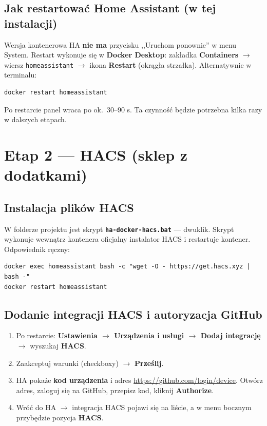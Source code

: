 \documentclass[11pt,a4paper]{article}
\begin{document}
\subsection{Jak restartować Home Assistant (w tej instalacji)}
\label{sec:restart}

Wersja kontenerowa HA \textbf{nie ma} przycisku ,,Uruchom ponownie'' w menu System. Restart wykonuje się w \textbf{Docker Desktop}: zakładka \textbf{Containers} $\to$ wiersz \texttt{homeassistant} $\to$ ikona \textbf{Restart} (okrągła strzałka). Alternatywnie w terminalu:

\begin{lstlisting}
docker restart homeassistant
\end{lstlisting}

Po restarcie panel wraca po ok.~30--90 s. Ta czynność będzie potrzebna kilka razy w dalszych etapach.

\section{Etap 2 --- HACS (sklep z dodatkami)}
\label{sec:etap2}

\subsection{Instalacja plików HACS}

W folderze projektu jest skrypt \textbf{\texttt{ha-docker-hacs.bat}} --- dwuklik. Skrypt wykonuje wewnątrz kontenera oficjalny instalator HACS i restartuje kontener. Odpowiednik ręczny:

\begin{lstlisting}
docker exec homeassistant bash -c "wget -O - https://get.hacs.xyz | bash -"
docker restart homeassistant
\end{lstlisting}

\subsection{Dodanie integracji HACS i autoryzacja GitHub}

\begin{enumerate}
\item Po restarcie: \textbf{Ustawienia $\to$ Urządzenia i usługi $\to$ Dodaj integrację} $\to$ wyszukaj \textbf{HACS}.
\item Zaakceptuj warunki (checkboxy) $\to$ \textbf{Prześlij}.
\item HA pokaże \textbf{kod urządzenia} i adres \url{https://github.com/login/device}. Otwórz adres, zaloguj się na GitHub, przepisz kod, kliknij \textbf{Authorize}.
\item Wróć do HA $\to$ integracja HACS pojawi się na liście, a w menu bocznym przybędzie pozycja \textbf{HACS}.
\end{enumerate}
\end{document}
